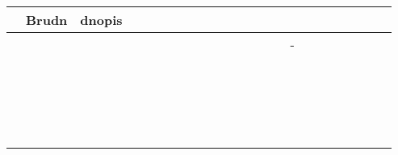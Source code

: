 \documentclass[10pt]{article}
\begin{document}
\begin{center}
\begin{tabular}{|c|c|c|c|c|c|c|c|c|c|c|c|c|c|c|c|c|c|c|c|c|c|c|}
\hline
 & Brudn & dnopis &  &  &  &  &  &  &  &  &  &  &  &  &  &  &  &  &  &  &  &  \\
\hline
 &  &  &  &  &  &  &  &  &  &  &  &  &  &  & - &  &  &  &  &  &  &  \\
\hline
 &  &  &  &  &  &  &  &  &  &  &  &  &  &  &  &  &  &  &  &  &  &  \\
\hline
 &  &  &  &  &  &  &  &  &  &  &  &  &  &  &  &  &  &  &  &  &  &  \\
\hline
 &  &  &  &  &  &  &  &  &  &  &  &  &  &  &  &  &  &  &  &  &  &  \\
\hline
 &  &  &  &  &  &  &  &  &  &  &  &  &  &  &  &  &  &  &  &  &  &  \\
\hline
 &  &  &  &  &  &  &  &  &  &  &  &  &  &  &  &  &  &  &  &  &  &  \\
\hline
 &  &  &  &  &  &  &  &  &  &  &  &  &  &  &  &  &  &  &  &  &  &  \\
\hline
 &  &  &  &  &  &  &  &  &  &  &  &  &  &  &  &  &  &  &  &  &  &  \\
\hline
 &  &  &  &  &  &  &  &  &  &  &  &  &  &  &  &  &  &  &  &  &  &  \\
\hline
 &  &  &  &  &  &  &  &  &  &  &  &  &  &  &  &  &  &  &  &  &  &  \\
\hline
 &  &  &  &  &  &  &  &  &  &  &  &  &  &  &  &  &  &  &  &  &  &  \\
\hline
 &  &  &  &  &  &  &  &  &  &  &  &  &  &  &  &  &  &  &  &  &  &  \\
\hline
 &  &  &  &  &  &  &  &  &  &  &  &  &  &  &  &  &  &  &  &  &  &  \\
\hline
 &  &  &  &  &  &  &  &  &  &  &  &  &  &  &  &  &  &  &  &  &  &  \\
\hline
 &  &  &  &  &  &  &  &  &  &  &  &  &  &  &  &  &  &  &  &  &  &  \\
\hline
 &  &  &  &  &  &  &  &  &  &  &  &  &  &  &  &  &  &  &  &  &  &  \\
\hline
 &  &  &  &  &  &  &  &  &  &  &  &  &  &  &  &  &  &  &  &  &  &  \\
\hline
 &  &  &  &  &  &  &  &  &  &  &  &  &  &  &  &  &  &  &  &  &  &  \\
\hline
 &  &  &  &  &  &  &  &  &  &  &  &  &  &  &  &  &  &  &  &  &  &  \\
\hline
 &  &  &  &  &  &  &  &  &  &  &  &  &  &  &  &  &  &  &  &  &  &  \\

\end{tabular}
\end{center}
\end{document}
